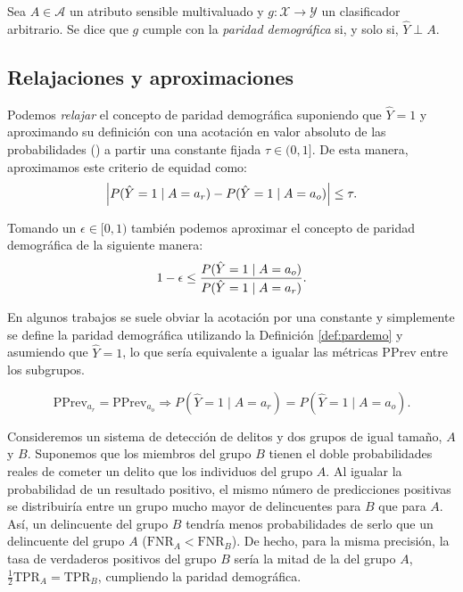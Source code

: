 \documentclass[oneside,openright,titlepage,numbers=noenddot,openany,headinclude,footinclude=true,
cleardoublepage=empty,abstractoff,BCOR=5mm,paper=a4,fontsize=12pt,main=spanish]{scrreprt}
\begin{document}
\begin{definition} \label{def:pardemo}
Sea $A \in \mathcal{A}$ un atributo sensible multivaluado y $g\colon \mathcal{X} \to \mathcal{Y}$ un clasificador arbitrario. Se dice que $g$ cumple con la \textit{paridad demográfica} si, y solo si, $\hat{Y} \perp A.$
\end{definition}

\subsection*{Relajaciones y aproximaciones}

Podemos \textit{relajar} el concepto de paridad demográfica suponiendo que $\hat{Y}=1$ y aproximando su definición con una acotación en valor absoluto de las probabilidades (\cite{constraints2017}) a partir una constante fijada $\tau \in (0,1]$. De esta manera, aproximamos este criterio de equidad como: 
\begin{equation*}
\left\lvert P(\hat{Y}=1 \mid A=a_r)-P(\hat{Y}=1 \mid A=a_o)\right\rvert \leq \tau.
\end{equation*}

Tomando un $\epsilon \in [0,1)$ también podemos aproximar el concepto de paridad demográfica de la siguiente manera:
\begin{equation}\label{eq:p}
   1-\epsilon \leq \frac{\displaystyle P(\hat{Y}=1 \mid A=a_o)}{\displaystyle P(\hat{Y}=1 \mid A=a_r)}. 
\end{equation}

En algunos trabajos se suele obviar la acotación por una constante y simplemente se define la paridad demográfica utilizando la Definición \ref{def:pardemo} y asumiendo que $\hat{Y}=1$, lo que sería equivalente a igualar las métricas PPrev entre los subgrupos.

\begin{equation*}
\text{PPrev}_{a_r}=\text{PPrev}_{a_o} \Rightarrow P(\hat{Y}=1 \mid A=a_r)=P(\hat{Y}=1 \mid A=a_o).
\end{equation*}

\begin{example}
Consideremos un sistema de detección de delitos y dos grupos de igual tamaño, $A$ y $B$. Suponemos que los miembros del grupo $B$ tienen el doble probabilidades reales de cometer un delito que los individuos del grupo $A$. Al igualar la probabilidad de un resultado positivo, el mismo número de predicciones positivas se distribuiría entre un grupo mucho mayor de delincuentes para $B$ que para $A$. Así, un delincuente del grupo $B$ tendría menos probabilidades de serlo que un delincuente del grupo $A$ ($\text{FNR}_A < \text{FNR}_B$). De hecho, para la misma precisión, la tasa de verdaderos positivos del grupo $B$ sería la mitad de la del grupo $A$, $\frac{1}{2} \text{TPR}_A = \text{TPR}_B$, cumpliendo la paridad demográfica.
\end{example}
\end{document}
